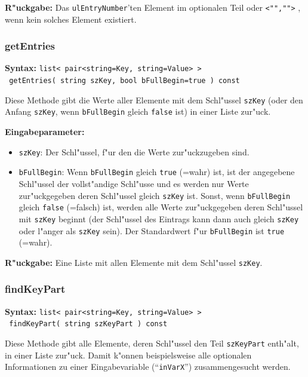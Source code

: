 \bigskip\noindent
\textbf{R"uckgabe:} Das \verb|ulEntryNumber|'ten Element im optionalen Teil oder \verb|<"","">| , wenn kein solches Element existiert.


\subsubsection{getEntries}

\textbf{Syntax:} \verb|list< pair<string=Key, string=Value> > | \\\verb| getEntries( string szKey, bool bFullBegin=true ) const|

\bigskip\noindent
Diese Methode gibt die Werte aller Elemente mit dem Schl"ussel \verb|szKey| (oder den Anfang \verb|szKey|, wenn \verb|bFullBegin| gleich \verb|false| ist) in einer Liste zur"uck.

\bigskip\noindent
\textbf{Eingabeparameter:}
\begin{itemize}
 \item \verb|szKey|: Der Schl"ussel, f"ur den die Werte zur"uckzugeben sind.
 \item \verb|bFullBegin|: Wenn \verb|bFullBegin| gleich \verb|true| (=wahr) ist, ist der angegebene Schl"ussel der vollst"andige Schl"usse und es werden nur Werte zur"uckgegeben deren Schl"ussel gleich \verb|szKey| ist. Sonst, wenn \verb|bFullBegin| gleich \verb|false| (=falsch) ist, werden alle Werte zur"uckgegeben deren Schl"ussel mit \verb|szKey| beginnt (der Schl"ussel des Eintrags kann dann auch gleich \verb|szKey| oder l"anger als \verb|szKey| sein). Der Standardwert f"ur \verb|bFullBegin| ist \verb|true| (=wahr).
\end{itemize}

\bigskip\noindent
\textbf{R"uckgabe:} Eine Liste mit allen Elemente mit dem Schl"ussel \verb|szKey|.


\subsubsection{findKeyPart}

\textbf{Syntax:} \verb|list< pair<string=Key, string=Value> > | \\\verb| findKeyPart( string szKeyPart ) const|

\bigskip\noindent
Diese Methode gibt alle Elemente, deren Schl"ussel den Teil \verb|szKeyPart| enth"alt, in einer Liste zur"uck.
Damit k"onnen beispielsweise alle optionalen Informationen zu einer Eingabevariable (``\verb|inVarX|'') zusammengesucht werden.

